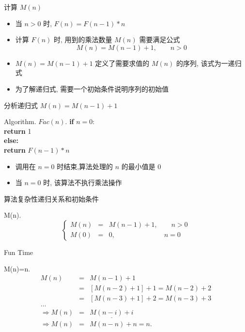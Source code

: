 \documentclass[fontset=fandol,UTF8,fleqn]{beamer}
\begin{document}
\begin{frame}{计算 $M(n)$}
\begin{itemize}[<+-|alert@+>]
\item 当 $n>0$ 时, $F(n)=F(n-1)* n$  
\item 计算 $F(n)$ 时, 用到的乘法数量 $M(n)$ 需要满足公式  
  \begin{displaymath}
    M(n) = M(n-1) + 1, \qquad n > 0  
  \end{displaymath}
\item $M(n)=M(n-1)+1$ 定义了需要求值的 $M(n)$ 的序列, 该式为一递归式 
\item 为了解递归式, 需要一个初始条件说明序列的初始值  
\end{itemize}
\end{frame}

\begin{frame}{分析递归式 $M(n)=M(n-1)+1$}
  \begin{exampleblock}{Algorithm. $Fac(n)$.}
    \qquad \textbf{if} $n = 0$: \\
    \quad\qquad \textbf{return} 1 \\
\qquad \textbf{else:} \\
\qquad\qquad \textbf{return} $F(n-1)*n$
\end{exampleblock}
\begin{itemize}[<+-|alert@+>]
\item 调用在 $n=0$ 时结束,算法处理的 $n$ 的最小值是 $0$  
\item 当 $n=0$ 时, 该算法不执行乘法操作 
\end{itemize}
\end{frame}

\begin{frame}{算法复杂性递归关系和初始条件}
  \begin{exampleblock}{M(n).}
    \begin{displaymath}
  \left\{ \begin{array}{lll}
  M(n) & = & M(n-1)+1, \qquad n > 0 \\
M(0) & = & 0, \qquad\ \qquad \quad \qquad n = 0
\end{array}\right.
\end{displaymath}
\end{exampleblock}
\end{frame}

\begin{frame}{Fun Time}
  \begin{exampleblock}{M(n)=n.}
    \begin{eqnarray*}
  M(n) & = & M(n-1)+ 1     \\
& = & [M(n-2)+1]+1  =  M(n-2)+2    \\
& = & [M(n-3)+1]+2 = M(n-3)+3   \\
\ldots   \\
\Rightarrow M(n) & = & \underline{M(n-i)+i}  \\
\Rightarrow M(n) & = & M(n-n)+n=n.  
    \end{eqnarray*}
  \end{exampleblock}
\end{frame}
\end{document}
